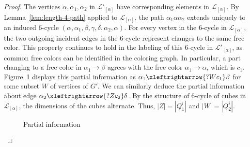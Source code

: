 \documentclass{amsart}
\theoremstyle{hypothesisstyle}
\theoremstyle{definition}
\theoremstyle{remark}
\numberwithin{equation}{section}
\begin{document}
\begin{proof}
The vertices $\alpha, \alpha_1, \alpha_2$ in $\mathcal{L}'_{[\alpha]}$ have corresponding elements in $\mathcal{L}_{[\alpha]}$. By Lemma~\ref{lem:length-4-path} applied to $\mathcal{L}_{[\alpha]}$, the path $\alpha_1\alpha\alpha_2$ extends uniquely to an induced 6-cycle $(\alpha, \alpha_1, \beta, \gamma, \delta, \alpha_2, \alpha)$. For every vertex in the 6-cycle in $\mathcal{L}_{[\alpha]}$, the two outgoing incident edges in the 6-cycle represent changes to the same free color. This property continues to hold in the labeling of this 6-cycle in $\mathcal{L}'_{[\alpha]}$, as common free colors can be identified in the coloring graph.   
In particular, a part changing to a free color in $\alpha_1\to \beta$ agrees with the free color $\alpha_1 \to \alpha$, which is $c_1$. Figure~\ref{fig:6-cycle-analysis} displays this partial information as $ \alpha_1\xleftrightarrow{?Wc_1}  \beta$ for some subset $W$ of vertices of $G'$.  We can similarly deduce the partial information about edge  $ \alpha_2\xleftrightarrow{?Zc_2}  \delta$. By the structure of $6$-cycle of cubes in $\mathcal{L}_{[\alpha]}$, the dimensions of the cubes alternate. Thus, $|Z|=|Q_{1}^{i}|$ and $|W|=|Q_{2}^{i}|$. 
\begin{figure}[htbp]
\centering
{}
\caption{Partial information}
\label{fig:6-cycle-analysis}
\end{figure}


\end{proof}
\end{document}
